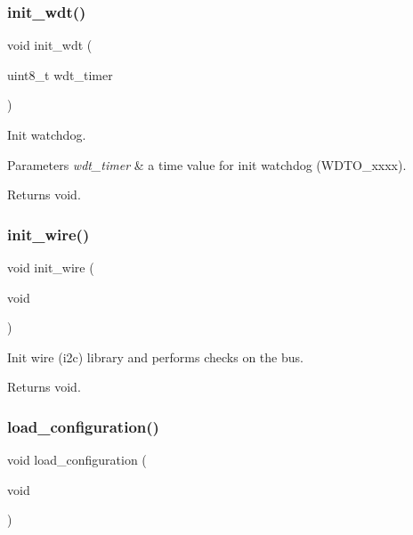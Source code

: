 \subsubsection{\texorpdfstring{init\+\_\+wdt()}{init\_wdt()}}
{\footnotesize\ttfamily void init\+\_\+wdt (\begin{DoxyParamCaption}\item[{uint8\+\_\+t}]{wdt\+\_\+timer }\end{DoxyParamCaption})}



Init watchdog. 


\begin{DoxyParams}{Parameters}
{\em wdt\+\_\+timer} & a time value for init watchdog (W\+D\+T\+O\+\_\+xxxx). \\
\hline
\end{DoxyParams}
\begin{DoxyReturn}{Returns}
void. 
\end{DoxyReturn}
\mbox{\label{rmap_8ino_a2441543100bf8421f56edd622a2c1d9a}} 
\subsubsection{\texorpdfstring{init\+\_\+wire()}{init\_wire()}}
{\footnotesize\ttfamily void init\+\_\+wire (\begin{DoxyParamCaption}\item[{void}]{ }\end{DoxyParamCaption})}



Init wire (i2c) library and performs checks on the bus. 

\begin{DoxyReturn}{Returns}
void. 
\end{DoxyReturn}
\mbox{\label{rmap_8ino_a32a64a2800c724fb28e10636f2ec20b9}} 
\subsubsection{\texorpdfstring{load\+\_\+configuration()}{load\_configuration()}}
{\footnotesize\ttfamily void load\+\_\+configuration (\begin{DoxyParamCaption}\item[{void}]{ }\end{DoxyParamCaption})}



